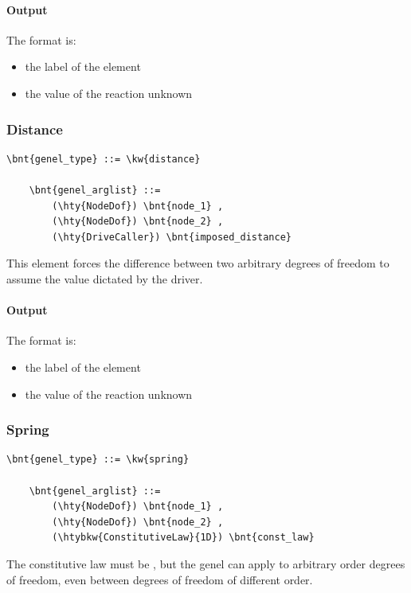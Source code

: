 \paragraph{Output}
The format is:
\begin{itemize}
    \item the label of the element
    \item the value of the reaction unknown
\end{itemize}
  
\subsubsection{Distance}
\label{sec:EL:GENEL:DISTANCE}
\begin{Verbatim}[commandchars=\\\{\}]
    \bnt{genel_type} ::= \kw{distance}

    \bnt{genel_arglist} ::=
        (\hty{NodeDof}) \bnt{node_1} ,
        (\hty{NodeDof}) \bnt{node_2} ,
        (\hty{DriveCaller}) \bnt{imposed_distance}
\end{Verbatim}
This element forces the difference between two arbitrary degrees of freedom
to assume the value dictated by the driver.

\paragraph{Output}
The format is:
\begin{itemize}
    \item the label of the element
    \item the value of the reaction unknown
\end{itemize}
  
\subsubsection{Spring}
\label{sec:EL:GENEL:SPRING}
\begin{Verbatim}[commandchars=\\\{\}]
    \bnt{genel_type} ::= \kw{spring}

    \bnt{genel_arglist} ::=
        (\hty{NodeDof}) \bnt{node_1} ,
        (\hty{NodeDof}) \bnt{node_2} ,
        (\htybkw{ConstitutiveLaw}{1D}) \bnt{const_law}
\end{Verbatim}
The constitutive law must be , but the 
genel can apply to arbitrary order degrees of freedom, even between degrees 
of freedom of different order.

